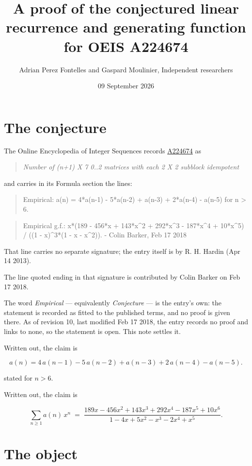 \documentclass[11pt]{article}
\title{A proof of the conjectured linear recurrence and generating function for OEIS A224674}
\author{Adrian Perez Fontelles and Gaspard Moulinier, Independent researchers}
\date{09 September 2026}
\theoremstyle{definition}
\begin{document}
\maketitle
\section{The conjecture}

The Online Encyclopedia of Integer Sequences records \href{https://oeis.org/A224674}{A224674} as

\begin{quote}\itshape Number of (n+1) X 7 0..2 matrices with each 2 X 2 subblock idempotent\end{quote}

and carries in its Formula section the lines:

\begin{quote}\ttfamily Empirical: a(n) = 4*a(n-1) - 5*a(n-2) + a(n-3) + 2*a(n-4) - a(n-5) for n > 6.\end{quote}

\begin{quote}\ttfamily Empirical g.f.: x*(189 - 456*x + 143*x\textasciicircum{}2 + 292*x\textasciicircum{}3 - 187*x\textasciicircum{}4 + 10*x\textasciicircum{}5) / ((1 - x)\textasciicircum{}3*(1 - x - x\textasciicircum{}2)). - Colin Barker, Feb 17 2018\end{quote}

That line carries no separate signature; the entry itself is by R. H. Hardin (Apr 14 2013).

The line quoted ending in that signature is contributed by Colin Barker on Feb 17 2018.

The word {\itshape Empirical} --- equivalently {\itshape Conjecture} --- is the entry's own: the statement is recorded as fitted to the published terms, and no proof is given there. As of revision 10, last modified Feb 17 2018, the entry records no proof and links to none, so the statement is open. This note settles it.

Written out, the claim is

\[a(n) = 4\,a(n-1) - 5\,a(n-2) + a(n-3) + 2\,a(n-4) - a(n-5).\]

stated for $n > 6$.

Written out, the claim is

\[\sum_{n \ge 1} a(n)\,x^n \;=\; \frac{189x - 456x^{2} + 143x^{3} + 292x^{4} - 187x^{5} + 10x^{6}}{1 - 4x + 5x^{2} - x^{3} - 2x^{4} + x^{5}}.\]

\section{The object}
\end{document}
